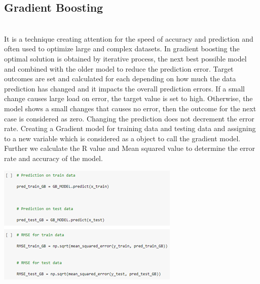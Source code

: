 \documentclass[journal,twoside,web]{ieeecolor}
\begin{document}
\subsection{Gradient Boosting}
\\
It is a technique creating attention for the speed of accuracy and prediction and often used to optimize large and complex datasets. In gradient boosting the optimal solution is obtained by iterative process, the next best possible model and combined with the older model to reduce the prediction error. Target outcomes are set and calculated for each depending on how much the data prediction has changed and it impacts the overall prediction errors. If a small change causes large load on error, the target value is set to high. Otherwise, the model shows a small changes that causes no error, then the outcome for the next case is considered as zero. Changing the prediction does not decrement the error rate. Creating a Gradient model for training data and testing data and assigning to a new variable which is considered as a object to call the gradient model. Further we calculate the R value and Mean squared value to determine the error rate and accuracy of the model.
\\
\begin{center}
\includegraphics[scale=0.70]{Picture14new.png}
\end{center}
\\
\\
\end{document}
